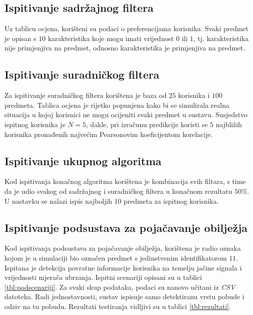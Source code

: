 \documentclass[times, utf8, diplomski, numeric]{fer}
\begin{document}


\subsection{Ispitivanje sadržajnog filtera}
Uz tablicu ocjena, korišteni su podaci o preferencijama korisnika. Svaki predmet
je opisan s $10$ karakteristika koje mogu imati vrijednost $0$ ili $1$, tj.
karakteristika nije primjenjiva na predmet, odnosno karakteristika je
primjenjiva na predmet.



\subsection{Ispitivanje suradničkog filtera}
Za ispitivanje suradničkog filtera korištena je baza od $25$ korisnika i $100$
predmeta. Tablica ocjena je rijetko popunjena kako bi se simulirala realna
situacija u kojoj korisnici ne mogu ocijeniti svaki predmet u sustavu.
Susjedstvo ispitnog korisnika je $N = 5$, dakle, pri izračunu predikcije koristi
se $5$ najbližih korisnika pronađenih najvećim Pearsonovim koeficijentom
korelacije.



\subsection{Ispitivanje ukupnog algoritma}
Kod ispitivanja konačnog algoritma korištena je kombinacija svih filtara, s time
da je udio svakog od sadržajnog i suradničkog filtera u konačnom rezultatu
$50\%$. U nastavku se nalazi ispis najboljih $10$ predmeta za ispitnog
korisnika.

 
	
\subsection{Ispitivanje podsustava za pojačavanje obilježja}
Kod ispitivanja podsustava za pojačavanje obilježja, korištena je radio oznaka
kojom je u simulaciji bio označen predmet s jedinstvenim identifikatorom $11$.
Ispitana je detekcija povratne informacije korisnika na temelju jačine signala i
vrijednosti mjerača ubrzanja. Ispitni scenariji opisani su u tablici
\ref{tbl:podscenariji}. Za svaki skup podataka, podaci su nanovo učitani iz
\emph{CSV} datoteka. Radi jednostavnosti, sustav ispisuje samo detektiranu vrstu
pobude i odziv na tu pobudu. Rezultati testiranja vidljivi su u tablici
\ref{tbl:rezultati}.
\end{document}
